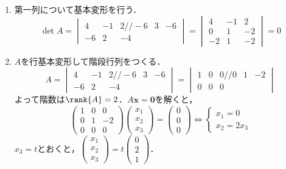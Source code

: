 \begin{souanswer} %
\begin{enumerate}
  \item 第一列について基本変形を行う．
\begin{equation*}
  \det{A}= 
\begin{vmatrix}
  4& -1& 2//
  -6& 3& -6\\
  -6& 2& -4
\end{vmatrix}= 
\begin{vmatrix}
  4& -1& 2\\
  0& 1& -2\\
  -2& 1& -2
\end{vmatrix}= 0
\end{equation*}
  \item $A$を行基本変形して階段行列をつくる．
\begin{equation*}
  A= 
\begin{vmatrix}
  4& -1& 2//
  -6& 3& -6\\
  -6& 2& -4
\end{vmatrix}= 
\begin{vmatrix}
  1& 0& 0//
  0& 1& -2\\
  0& 0& 0
\end{vmatrix}
\end{equation*}
  よって階数は$\rank{A}= 2$．$A\bm{x}= \bm{0}$を解くと，
\begin{equation*}
\begin{pmatrix}
  1& 0& 0\\
  0& 1& -2\\
  0& 0& 0
\end{pmatrix}\begin{pmatrix}x_1\\ x_2\\ x_3\end{pmatrix}= \begin{pmatrix}0\\ 0\\ 0\end{pmatrix}
  \iff \begin{cases}x_1= 0\\ x_2= 2x_3\end{cases}
\end{equation*}
  $x_3= t$とおくと，$\begin{pmatrix}x_1\\ x_2\\ x_3\end{pmatrix}= t\begin{pmatrix}0\\ 2\\ 1\end{pmatrix}$．\\

\end{enumerate}
\end{souanswer}
